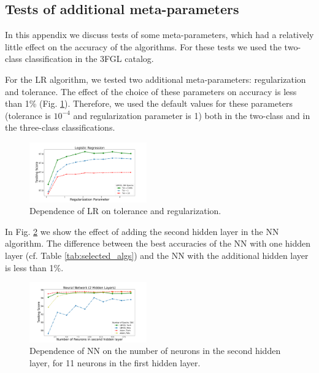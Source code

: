 \documentclass[referee]{aa} %
\newcommand{\lb}{\label}
\newcommand{\twopicsp}{0.45}
\begin{document}
\begin{appendix}
\section{Tests of additional meta-parameters}
\lb{sec:app}

In this appendix we discuss tests of some meta-parameters, which had a relatively little effect on the 
accuracy of the algorithms. For these tests we used the two-class classification in the 3FGL catalog.

For the LR algorithm, we tested two additional meta-parameters: regularization and tolerance. 
The effect of the choice of these parameters on accuracy is less than 1\% (Fig. \ref{fig:LR_tol_reg}). 
Therefore, we used the default values for these parameters (tolerance is $10^{-4}$ and regularization parameter is 1)
both in the two-class and in the three-class classifications.

\begin{figure}[h]
\centering
\includegraphics[width=\twopicsp\textwidth]{plots/lr_train_reg.pdf}
\caption{Dependence of LR on tolerance and regularization. 
}
\label{fig:LR_tol_reg}
\end{figure}

In Fig. \ref{fig:nn_nn} we show the effect of adding the second hidden layer in the NN algorithm.
The difference between the best accuracies of the NN with one hidden layer (cf. Table \ref{tab:selected_algs})
and  the NN with the additional hidden layer is less than 1\%.
\begin{figure}[h]
\centering
\includegraphics[width=\twopicsp\textwidth]{plots/nn_2layers_3fgl.pdf}
\caption{Dependence of NN on the number of neurons in the second hidden layer, for 11 neurons in the first hidden layer.
}
\label{fig:nn_nn}
\end{figure}



\end{appendix}
\end{document}

